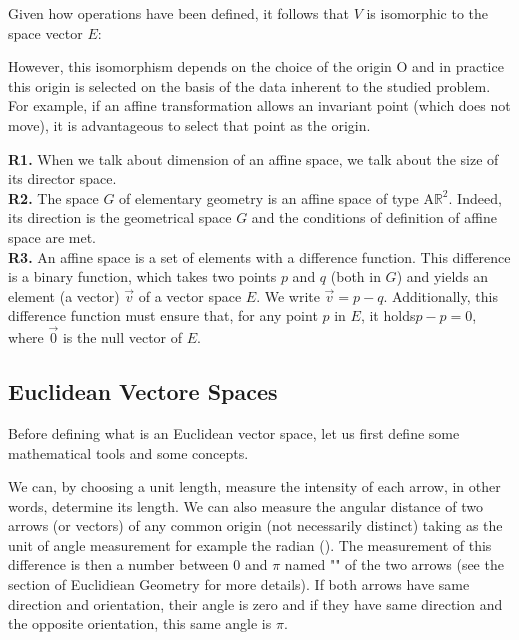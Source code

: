 	Given how operations have been defined, it follows that $V$ is isomorphic to the space vector $E$:
	
	However, this isomorphism depends on the choice of the origin $\text{O}$ and in practice this origin is selected on the basis of the data inherent to the studied problem. For example, if an affine transformation allows an invariant point (which does not move), it is advantageous to select that point as the origin.
	\begin{tcolorbox}[title=Remarks,colframe=black,arc=10pt]
	\textbf{R1.} When we talk about dimension of an affine space, we talk about the size of its director space.\\
	
	\textbf{R2.} The space $G$ of elementary geometry is an affine space of type $\text{A}\mathbb{R}^2$. Indeed, its direction is the geometrical space $G$ and the conditions of definition of affine space are met.\\
	
	\textbf{R3.} An affine space is a set of elements with a difference function. This difference is a binary function, which takes two points $p$ and $q$ (both in $G$) and yields an element (a vector) $\vec{v}$ of a vector space $E$. We write $\vec{v}=p-q.$ Additionally, this difference function must ensure that, for any point $p$ in $E$, it holds$p-p=0$, where $\vec{0}$ is the null vector of $E$.
	\end{tcolorbox}
	
	\pagebreak
	\subsection{Euclidean Vectore Spaces}
	Before defining what is an Euclidean vector space, let us first define some mathematical tools and some concepts.
	
	We can, by choosing a unit length, measure the intensity of each arrow, in other words, determine its length. We can also measure the angular distance of two arrows (or vectors) of any common origin (not necessarily distinct) taking as the unit of angle measurement for example the radian (). The measurement of this difference is then a number between $0$ and $\pi$ named "" of the two arrows (see the section of Euclidiean Geometry for more details). If both arrows have same direction and orientation, their angle is zero and if they have same direction and the opposite orientation, this same angle is $\pi$.
	
